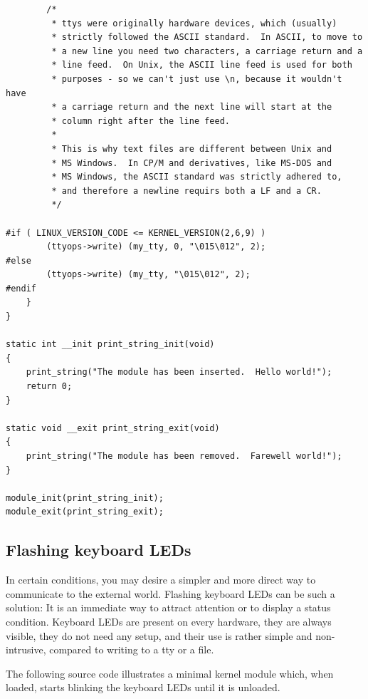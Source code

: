 \documentclass[11pt]{article}
\begin{document}
\begin{verbatim}
        /*
         * ttys were originally hardware devices, which (usually)
         * strictly followed the ASCII standard.  In ASCII, to move to
         * a new line you need two characters, a carriage return and a
         * line feed.  On Unix, the ASCII line feed is used for both
         * purposes - so we can't just use \n, because it wouldn't have
         * a carriage return and the next line will start at the
         * column right after the line feed.
         *
         * This is why text files are different between Unix and
         * MS Windows.  In CP/M and derivatives, like MS-DOS and
         * MS Windows, the ASCII standard was strictly adhered to,
         * and therefore a newline requirs both a LF and a CR.
         */

#if ( LINUX_VERSION_CODE <= KERNEL_VERSION(2,6,9) )
        (ttyops->write) (my_tty, 0, "\015\012", 2);
#else
        (ttyops->write) (my_tty, "\015\012", 2);
#endif
    }
}

static int __init print_string_init(void)
{
    print_string("The module has been inserted.  Hello world!");
    return 0;
}

static void __exit print_string_exit(void)
{
    print_string("The module has been removed.  Farewell world!");
}

module_init(print_string_init);
module_exit(print_string_exit);
\end{verbatim}

\subsection*{Flashing keyboard LEDs}
\label{sec:orgdf21c40}
In certain conditions, you may desire a simpler and more direct way to communicate to the external world. Flashing keyboard LEDs can be such a solution: It is an immediate way to attract attention or to display a status condition. Keyboard LEDs are present on every hardware, they are always visible, they do not need any setup, and their use is rather simple and non-intrusive, compared to writing to a tty or a file.

The following source code illustrates a minimal kernel module which, when loaded, starts blinking the keyboard LEDs until it is unloaded.
\end{document}
